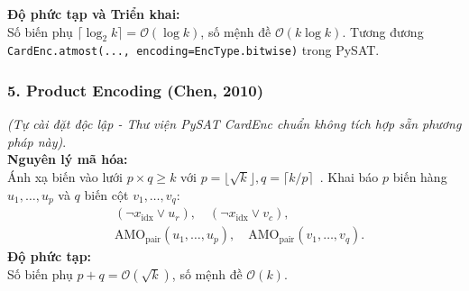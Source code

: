 \documentclass[a4paper,fleqn]{cas-sc}
\begin{document}
\textbf{Độ phức tạp và Triển khai:}\\
Số biến phụ $\lceil \log_2 k \rceil = \mathcal{O}(\log k)$, số mệnh đề $\mathcal{O}(k \log k)$. Tương đương \texttt{CardEnc.atmost(..., encoding=EncType.bitwise)} trong PySAT.

\subsubsection{5. Product Encoding (Chen, 2010)}
\textit{(Tự cài đặt độc lập - Thư viện PySAT CardEnc chuẩn không tích hợp sẵn phương pháp này)}.\\
\textbf{Nguyên lý mã hóa:}\\
Ánh xạ biến vào lưới $p \times q \ge k$ với $p = \lfloor \sqrt{k} \rfloor, q = \lceil k / p \rceil$~\cite{chen2010product}.
Khai báo $p$ biến hàng $u_1, \dots, u_p$ và $q$ biến cột $v_1, \dots, v_q$:
\begin{align}
    &(\neg x_{\text{idx}} \lor u_r), \quad (\neg x_{\text{idx}} \lor v_c), \\
    &\text{AMO}_{\text{pair}}(u_1, \dots, u_p), \quad \text{AMO}_{\text{pair}}(v_1, \dots, v_q).
\end{align}
\textbf{Độ phức tạp:}\\
Số biến phụ $p + q = \mathcal{O}(\sqrt{k})$, số mệnh đề $\mathcal{O}(k)$.

\begin{table}[htbp]
\caption{So sánh lý thuyết độ phức tạp của 5 kỹ thuật mã hóa AMO cho một nhóm $k$ biến và toàn bàn cờ $N \times N$.}
\label{tab:amo_complexity}
\centering
\renewcommand{\arraystretch}{1.22}
\end{table}
\end{document}
